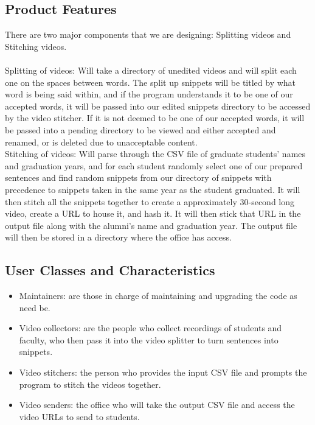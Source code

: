 \subsection{Product Features}
There are two major components that we are designing: Splitting videos and 
Stitching 
videos.\\\\
Splitting of videos: Will take a directory of unedited videos and will split 
each one on the spaces between words. The split up snippets will be titled by what 
word is being said within, and if the program understands it to be one of our 
accepted words, it will be passed into our edited snippets directory to be accessed 
by the video stitcher. If it is not deemed to be one of our accepted words, it 
will be passed into a pending directory to be viewed and either accepted and 
renamed, or is deleted due to unacceptable content.\\
Stitching of videos: Will parse through the CSV file of graduate students' names 
and graduation years, and for each student randomly select one of our prepared 
sentences and find random snippets from our directory of snippets with precedence to 
snippets taken in the same year as the student graduated. It will then stitch all 
the snippets together to create a approximately 30-second long video, create a URL 
to house it, and hash it. It will then stick that URL in the output file along 
with the alumni's name and graduation year. The output file will then be stored 
in a directory where the office has access. 

\subsection{User Classes and Characteristics}
\begin{itemize}
    \item Maintainers: are those in charge of maintaining and upgrading 
    the code as need be.
    \item Video collectors: are the people who collect recordings of 
    students and faculty, who then pass it into the video splitter to 
    turn sentences into snippets.
    \item Video stitchers: the person who provides the input CSV file 
    and prompts the program to stitch the videos together.
    \item Video senders: the office who will take the output CSV file 
    and access the video URLs to send to students.
\end{itemize}

